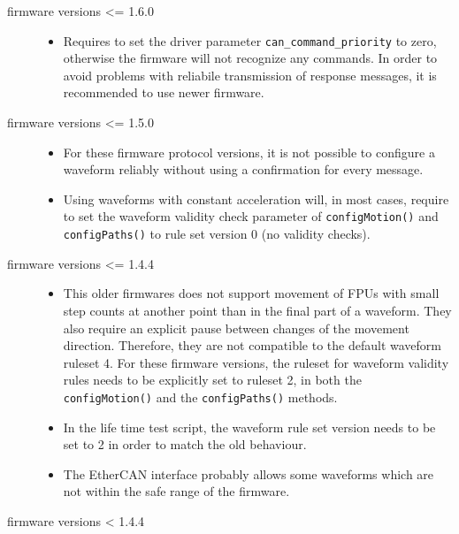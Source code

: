 \documentclass[11pt,a4paper]{scrartcl}
\begin{document}
\begin{description}
  \item[firmware versions <= 1.6.0]
    \begin{itemize}
    \item Requires to set the driver parameter
      \texttt{can\_command\_priority} to zero, otherwise the firmware
      will not recognize any commands. In order to avoid problems with
      reliabile transmission of response messages, it is recommended
      to use newer firmware.
  \end{itemize}

\item[firmware versions <= 1.5.0]
  \begin{itemize}
      
    \item For these firmware protocol versions, it is not possible to
      configure a waveform reliably without using a confirmation for
      every message.
    \item Using waveforms with constant acceleration will, in most
      cases, require to set the waveform validity check parameter of
      \texttt{configMotion()} and \texttt{configPaths()} to rule set
      version 0 (no validity checks).
    
  \end{itemize}

  
\item[firmware versions <= 1.4.4]
  
\begin{itemize}
  \item This older firmwares does not support movement of FPUs with
    small step counts at another point than in the final part of a
    waveform.  They also require an explicit pause between changes of
    the movement direction. Therefore, they are not compatible to the
    default waveform ruleset 4.  For these firmware versions, the
    ruleset for waveform validity rules needs to be explicitly set to
    ruleset 2, in both the \texttt{configMotion()} and the
    \texttt{configPaths()} methods.
    \item In the life time test script, the waveform rule set version
      needs to be set to 2 in order to match the old behaviour.
  
\item The EtherCAN interface probably allows some waveforms which are not within
  the safe range of the firmware.
  \end{itemize}
\item[firmware versions < 1.4.4]
  

\end{description}
\end{document}
